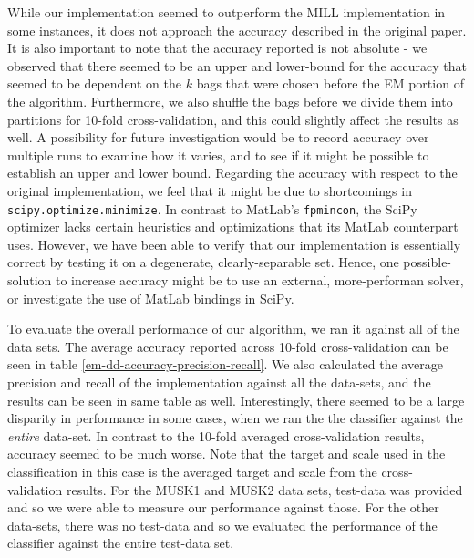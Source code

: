 \documentclass[conference]{IEEEtran}
\begin{document}
While our implementation seemed to outperform the MILL implementation in some instances, it does not approach the accuracy described in the original paper. It is also important to note that the accuracy reported is not absolute - we observed that there seemed to be an upper and lower-bound for the accuracy that seemed to be dependent on the $k$ bags that were chosen before the EM portion of the algorithm. Furthermore, we also shuffle the bags before we divide them into partitions for 10-fold cross-validation, and this could slightly affect the results as well. A possibility for future investigation would be to record accuracy over multiple runs to examine how it varies, and to see if it might be possible to establish an upper and lower bound. Regarding the accuracy with respect to the original implementation, we feel that it might be due to shortcomings in \texttt{scipy.optimize.minimize}. In contrast to MatLab's \texttt{fpmincon}, the SciPy optimizer lacks certain heuristics and optimizations that its MatLab counterpart uses. However, we have been able to verify that our implementation is essentially correct by testing it on a degenerate, clearly-separable set. Hence, one possible-solution to increase accuracy might be to use an external, more-performan solver, or investigate the use of MatLab bindings in SciPy.

To evaluate the overall performance of our algorithm, we ran it against all of the data sets. The average accuracy reported across 10-fold cross-validation can be seen in table \ref{em-dd-accuracy-precision-recall}. We also calculated the average precision and recall of the implementation against all the data-sets, and the results can be seen in same table as well. Interestingly, there seemed to be a large disparity in performance in some cases, when we ran the the classifier against the \textit{entire} data-set. In contrast to the 10-fold averaged cross-validation results, accuracy seemed to be much worse. Note that the target and scale used in the classification in this case is the averaged target and scale from the cross-validation results. For the MUSK1 and MUSK2 data sets, test-data was provided and so we were able to measure our performance against those. For the other data-sets, there was no test-data and so we evaluated the performance of the classifier against the entire test-data set. 
\end{document}
